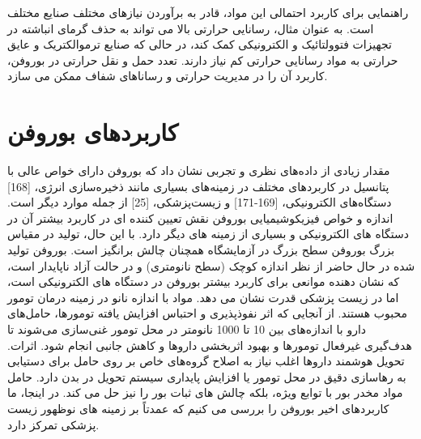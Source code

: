 راهنمایی برای کاربرد احتمالی این مواد، قادر به برآوردن نیازهای مختلف صنایع مختلف است. به عنوان مثال، رسانایی حرارتی بالا می تواند به حذف گرمای انباشته در تجهیزات فتوولتائیک و الکترونیکی کمک کند، در حالی که صنایع ترموالکتریک و عایق حرارتی به مواد رسانایی حرارتی کم نیاز دارند. تعدد حمل و نقل حرارتی در بوروفن، کاربرد آن را در مدیریت حرارتی و رساناهای شفاف ممکن می سازد.
\section{کاربردهای بوروفن}
مقدار زیادی از داده‌های نظری و تجربی نشان داد که بوروفن دارای خواص عالی با پتانسیل در کاربردهای مختلف در زمینه‌های بسیاری مانند ذخیره‌سازی انرژی، \cite{raoUltrahighEnergyStorage2017}[168] دستگاه‌های الکترونیکی، \cite{pengTuningElectronicStructure2016, mortazaviBoropheneAnodeMaterial2016}[169-171] و زیست‌پزشکی، \cite{jiNovelTopDownSynthesis2018}[25] از جمله موارد دیگر است. اندازه و خواص فیزیکوشیمیایی بوروفن نقش تعیین کننده ای در کاربرد بیشتر آن در دستگاه های الکترونیکی و بسیاری از زمینه های دیگر دارد. با این حال، تولید در مقیاس بزرگ بوروفن سطح بزرگ در آزمایشگاه همچنان چالش برانگیز است. بوروفن تولید شده در حال حاضر از نظر اندازه کوچک (سطح نانومتری) و در حالت آزاد ناپایدار است، که نشان دهنده موانعی برای کاربرد بیشتر بوروفن در دستگاه های الکترونیکی است، اما در زیست پزشکی قدرت نشان می دهد. مواد با اندازه نانو در زمینه درمان تومور محبوب هستند. از آنجایی که اثر نفوذپذیری و احتباس  افزایش یافته تومورها، حامل‌های دارو با اندازه‌های بین 10 تا 1000 نانومتر در محل تومور غنی‌سازی می‌شوند تا هدف‌گیری غیرفعال تومورها و بهبود اثربخشی داروها و کاهش جانبی انجام شود. اثرات. تحویل هوشمند داروها اغلب نیاز به اصلاح گروه‌های خاص بر روی حامل برای دستیابی به رهاسازی دقیق در محل تومور یا افزایش پایداری سیستم تحویل در بدن دارد. حامل مواد مخدر بور با توابع ویژه، بلکه چالش های ثبات بور را نیز حل می کند. در اینجا، ما کاربردهای اخیر بوروفن را بررسی می کنیم که عمدتاً بر زمینه های نوظهور زیست پزشکی تمرکز دارد.
